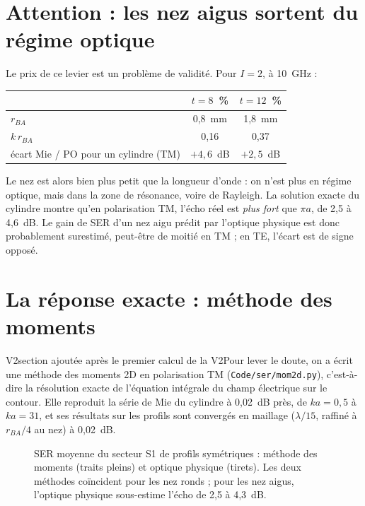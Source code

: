 \section{Attention : les nez aigus sortent du régime optique}
Le prix de ce levier est un problème de validité. Pour $I=2$, à 10~GHz :
\begin{center}
\begin{tabular}{lcc}
\toprule
 & $t=8$~\% & $t=12$~\% \\
\midrule
$r_{BA}$ & 0,8~mm & 1,8~mm \\
$k\,r_{BA}$ & 0,16 & 0,37 \\
écart Mie / PO pour un cylindre (TM) & $+4{,}6$~dB & $+2{,}5$~dB \\
\bottomrule
\end{tabular}
\end{center}
Le nez est alors bien plus petit que la longueur d'onde : on n'est plus en régime optique, mais dans la zone de résonance, voire de Rayleigh. La solution exacte du cylindre montre qu'en polarisation TM, l'écho réel est \emph{plus fort} que $\pi a$, de 2,5 à 4,6~dB. Le gain de SER d'un nez aigu prédit par l'optique physique est donc probablement surestimé, peut-être de moitié en TM ; en TE, l'écart est de signe opposé.

\section{La réponse exacte : méthode des moments}
\begin{evolution}{V2}{section ajoutée après le premier calcul de la V2}Pour lever le doute, on a écrit une méthode des moments 2D en polarisation TM (\texttt{Code/ser/mom2d.py}), c'est-à-dire la résolution exacte de l'équation intégrale du champ électrique sur le contour. Elle reproduit la série de Mie du cylindre à 0,02~dB près, de $ka=0{,}5$ à $ka=31$, et ses résultats sur les profils sont convergés en maillage ($\lambda/15$, raffiné à $r_{BA}/4$ au nez) à 0,02~dB.\end{evolution}

\begin{figure}[htbp]
\centering

\caption{SER moyenne du secteur S1 de profils symétriques : méthode des moments (traits pleins) et optique physique (tirets). Les deux méthodes coïncident pour les nez ronds ; pour les nez aigus, l'optique physique sous-estime l'écho de 2,5 à 4,3~dB.}\label{fig:v2-mom}
\end{figure}

